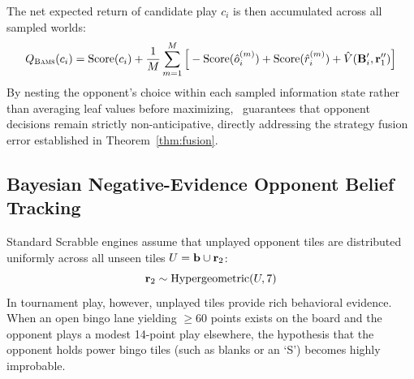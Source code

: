 The net expected return of candidate play $c_i$ is then accumulated across all sampled worlds:
\begin{equation}
    \label{eq:bams_equity}
    Q_{\textsc{Bams}}(c_i) = \mathrm{Score}(c_i) + \frac{1}{M} \sum_{m=1}^M \Big[ -\mathrm{Score}(\hat{o}_i^{(m)}) + \mathrm{Score}(\hat{r}_i^{(m)}) + \hat{V}(\mathbf{B}_i', \mathbf{r}_1'') \Big]
\end{equation}
By nesting the opponent's choice within each sampled information state rather than averaging leaf values before maximizing, \bams\ guarantees that opponent decisions remain strictly non-anticipative, directly addressing the strategy fusion error established in Theorem~\ref{thm:fusion}.

\subsection{Bayesian Negative-Evidence Opponent Belief Tracking}

Standard Scrabble engines assume that unplayed opponent tiles are distributed uniformly across all unseen tiles $U = \mathbf{b} \cup \mathbf{r}_2$:
\begin{equation}
    \mathbf{r}_2 \sim \mathrm{Hypergeometric}(U, 7)
\end{equation}
In tournament play, however, unplayed tiles provide rich behavioral evidence. When an open bingo lane yielding $\ge 60$ points exists on the board and the opponent plays a modest 14-point play elsewhere, the hypothesis that the opponent holds power bingo tiles (such as blanks or an `S') becomes highly improbable.

